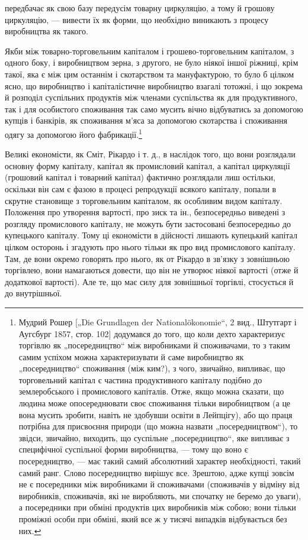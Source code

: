 \parcont{}  %
передбачає як свою базу передусім товарну циркуляцію, а тому
й грошову циркуляцію, — вивести їх як форми, що необхідно
виникають з процесу виробництва як такого.

Якби між товарно-торговельним капіталом і грошево-торговельним
капіталом, з одного боку, і виробництвом зерна, з
другого, не було ніякої іншої ріжниці, крім такої, яка є між цим
останнім і скотарством та мануфактурою, то було б цілком
ясно, що виробництво і капіталістичне виробництво взагалі
тотожні, і що зокрема й розподіл суспільних продуктів між членами
суспільства як для продуктивного, так і для особистого
споживання так само мусить вічно відбуватись за допомогою
купців і банкірів, як споживання м’яса за допомогою скотарства
і споживання одягу за допомогою його фабрикації.\footnote{
Мудрий Рошер [„Die Grundlagen der Nationalökonomie“, 2 вид., Штутгарт
і Аугсбург 1857, стор. 102] додумався до того, що коли дехто характеризує
торгівлю як „посередництво“ між виробниками й споживачами, то з таким самим
успіхом можна характеризувати й саме виробництво як „посередництво“
споживання (між ким?), з чого, звичайно, випливає, що торговельний капітал
є частина продуктивного капіталу подібно до землеробського і промислового
капіталів. Отже, якщо можна сказати, що людина може опосереднювати своє
споживання тільки виробництвом (а це вона мусить зробити, навіть не здобувши
освіти в Лейпцігу), або що праця потрібна для присвоєння природи (що можна
назвати „посередництвом“), то звідси, звичайно, виходить, що суспільне „посередництво“, яке випливає
з специфічної суспільної форми виробництва, — тому
що воно є посередництво, — має такий самий абсолютний характер необхідності,
такий самий ранг. Слово посередництво вирішує все. Зрештою, адже купці зовсім
не є посередники між виробниками й споживачами (споживачів у відміну від виробників, споживачів, які
не виробляють, ми спочатку не беремо до уваги), а посередники при обміні продуктів цих виробників
між собою; вони тільки проміжні
особи при обміні, який все ж у тисячі випадків відбувається без них.
}

Великі економісти, як Сміт, Рікардо і т. д., в наслідок того,
що вони розглядали основну форму капіталу, капітал як промисловий
капітал, а капітал циркуляції (грошовий капітал і товарний
капітал) фактично розглядали лиш остільки, оскільки він
сам є фазою в процесі репродукції всякого капіталу, попали в
скрутне становище з торговельним капіталом, як особливим видом
капіталу. Положення про утворення вартості, про зиск та
ін., безпосередньо виведені з розгляду промислового капіталу,
не можуть бути застосовані безпосередньо до купецького капіталу.
Тому ці економісти в дійсності лишають купецький капітал
цілком осторонь і згадують про нього тільки як про вид
промислового капіталу. Там, де вони окремо говорять про
нього, як от Рікардо в зв’язку з зовнішньою торгівлею, вони
намагаються довести, що він не утворює ніякої вартості (отже
й додаткової вартості). Але те, що має силу для зовнішньої
торгівлі, стосується й до внутрішньої.

